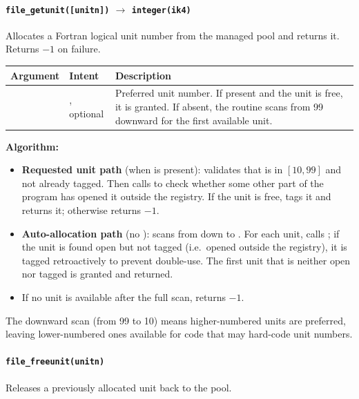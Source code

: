 \paragraph{\texttt{file\_getunit([unitn])} $\to$ \texttt{integer(ik4)}}

Allocates a Fortran logical unit number from the managed pool and returns it.
Returns $-1$ on failure.

\begin{longtable}{L{3cm} L{3cm} L{8cm}}
  \toprule
  \textbf{Argument} & \textbf{Intent} & \textbf{Description} \\
  \midrule
  \endhead
  \bottomrule
  \endfoot
   & , optional & Preferred unit number.
    If present and the unit is free, it is granted. If absent, the routine
    scans from 99 downward for the first available unit. \\
\end{longtable}

\textbf{Algorithm:}
\begin{itemize}
  \item \textbf{Requested unit path} (when  is present): validates
        that  is in $[10, 99]$ and not already tagged. Then calls
         to check whether some other part of the program has
        opened it outside the registry. If the unit is free, tags it and
        returns it; otherwise returns $-1$.
  \item \textbf{Auto-allocation path} (no ): scans from
         down to . For each unit,
        calls ; if the unit is found open but not tagged (i.e.\
        opened outside the registry), it is tagged retroactively to prevent
        double-use. The first unit that is neither open nor tagged is granted
        and returned.
  \item If no unit is available after the full scan, returns $-1$.
\end{itemize}

The downward scan (from 99 to 10) means higher-numbered units are preferred,
leaving lower-numbered ones available for code that may hard-code unit numbers.

\paragraph{\texttt{file\_freeunit(unitn)}}

Releases a previously allocated unit back to the pool.

